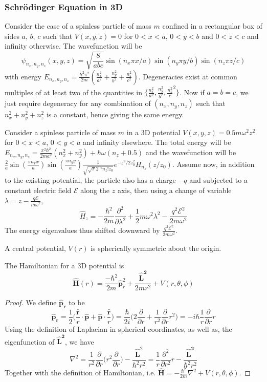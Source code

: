 \documentclass[a4paper]{article}
\begin{document}
\subsubsection*{Schr\"{o}dinger Equation in 3D}
\begin{eg}
Consider the case of a spinless particle of mass $m$ confined in a rectangular box of sides $a$, $b$, $c$ such that $V(x,y,z)=0$ for $0<x<a$, $0<y<b$ and $0<z<c$ and infinity otherwise. The wavefunction will be
$$\psi_{n_x,n_y,n_z}(x,y,z)=\sqrt{\frac{8}{abc}}\sin(n_x\pi x/a)\sin(n_y\pi y/b)\sin(n_z\pi z/c)$$
with energy $E_{n_x,n_y,n_z}=\frac{\hbar^2\pi^2}{2m}(\frac{n_x^2}{a^2}+\frac{n_y^2}{b^2}+\frac{n_z^2}{c^2})$. Degeneracies exist at common multiples of at least two of the quantities in $\{\frac{n_x^2}{a^2},\frac{n_y^2}{b^2},\frac{n_z^2}c^2\}$. Now if $a=b=c$, we just require degeneracy for any combination of $(n_x,n_y,n_z)$ such that $n_x^2+n_y^2+n_z^2$ is a constant, hence giving the same energy.
\end{eg}
\begin{eg}
Consider a spinless particle of mass $m$ in a 3D potential $V(x,y,z)=0.5m\omega^2z^2$ for $0<x<a$, $0<y<a$ and infinity elsewhere. The total energy will be $E_{n_x,n_y,n_z}=\frac{\pi^2\hbar^2}{2ma^2}(n_x^2+n_y^2)+\hbar\omega(n_z+0.5)$ and the wavefunction will be $\frac{2}{a}\sin(
\frac{\pi n_x x}{a})\sin(\frac{\pi n_y y}{a})\frac{1}{\sqrt{\sqrt{\pi}2^{n_z}n_z!z_0}}e^{-z^2/2z_0^2}H_{n_z}(z/z_0)$. Assume now, in addition to the existing potential, the particle also has a charge $-q$ and subjected to a constant electric field $\mathcal{E}$ along the $z$ axis, then using a change of variable $\lambda=z-\frac{q\mathcal{E}}{m\omega^2}$,
$$\hat{H}_z=-\frac{\hbar^2}{2m}\frac{\partial^2}{\partial\lambda^2}+\frac{1}{2}m\omega^2\lambda^2-\frac{q^2\mathcal{E}^2}{2m\omega^2}$$
The energy eigenvalues thus shifted downward by $\frac{q^2\mathcal{E}^2}{2m\omega^2}$.
\end{eg}
\begin{defi}
A central potential, $V(r)$ is spherically symmetric about the origin.
\end{defi}
\begin{thm}
The Hamiltonian for a 3D potential is
$$\mathbf{\hat{H}}(r)=\frac{-\hbar^2}{2m}\mathbf{\hat{p}}_r^2+\frac{\mathbf{\hat{L}^2}}{2mr^2}+V(r,\theta,\phi)$$
\end{thm}
\begin{proof}
We define $\mathbf{\hat{p}_r}$ to be
$$\mathbf{\hat{p}_r}=\frac{1}{2}\bigg(\frac{\mathbf{\hat{r}}}{r}\cdot\mathbf{\hat{p}}+\mathbf{\hat{p}}\cdot\frac{\mathbf{\hat{r}}}{r}\bigg)=\frac{\hbar}{2i}\bigg(2\frac{\partial}{\partial r}+\frac{1}{r^2}\frac{\partial}{\partial r}r^2\bigg)=-i\hbar\frac{1}{r}\frac{\partial}{\partial r}r$$
Using the definition of Laplacian in spherical coordinates, as well as, the eigenfunction of $\mathbf{\hat{L}^2}$, we have
$$\nabla^2=\frac{1}{r^2}\frac{\partial}{\partial r}\bigg(r^2\frac{\partial}{\partial r}\bigg)-\frac{\mathbf{\hat{L}}^2}{\hbar^2r^2}=\frac{1}{r}\frac{\partial^2}{\partial r^2}r-\frac{\mathbf{\hat{L}^2}}{\hbar^2r^2}$$
Together with the definition of Hamiltonian, i.e. $\mathbf{\hat{H}}=-\frac{\hbar^2}{2m}\nabla^2+V(r,\theta,\phi)$.
\end{proof}
\end{document}
